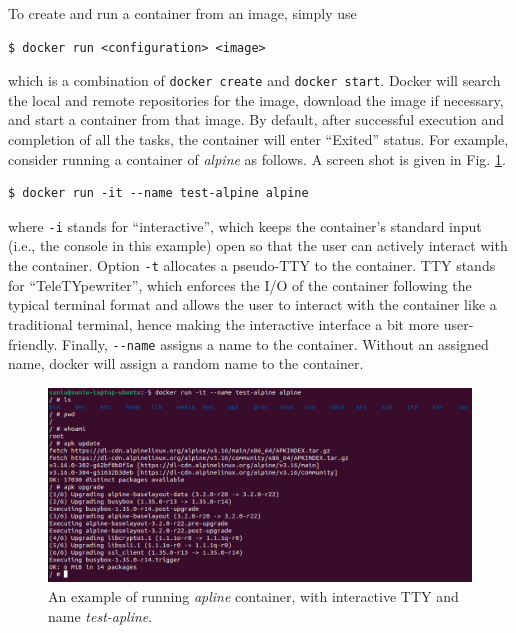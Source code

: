 To create and run a container from an image, simply use
\begin{lstlisting}
$ docker run <configuration> <image>
\end{lstlisting}
which is a combination of \verb|docker create| and \verb|docker start|. Docker will search the local and remote repositories for the image, download the image if necessary, and start a container from that image. By default, after successful execution and completion of all the tasks, the container will enter ``Exited'' status. For example, consider running a container of \textit{alpine} as follows. A screen shot is given in Fig. \ref{ch:vac:fig:dockerrunexp}.
\begin{lstlisting}
$ docker run -it --name test-alpine alpine
\end{lstlisting}
where \verb|-i| stands for ``interactive'', which keeps the container's standard input (i.e., the console in this example) open so that the user can actively interact with the container. Option \verb|-t| allocates a pseudo-TTY to the container. TTY stands for ``TeleTYpewriter'', which enforces the I/O of the container following the typical terminal format and allows the user to interact with the container like a traditional terminal, hence making the interactive interface a bit more user-friendly. Finally, \verb|--name| assigns a name to the container. Without an assigned name, docker will assign a random name to the container.
\begin{figure}[htbp]
	\centering
	\includegraphics[width=350pt]{chapters/ch-virtualization-and-containerization/figures/dockerrunexp.png}
	\caption{An example of running \textit{apline} container, with interactive TTY and name \textit{test-apline}.} \label{ch:vac:fig:dockerrunexp}
\end{figure}

